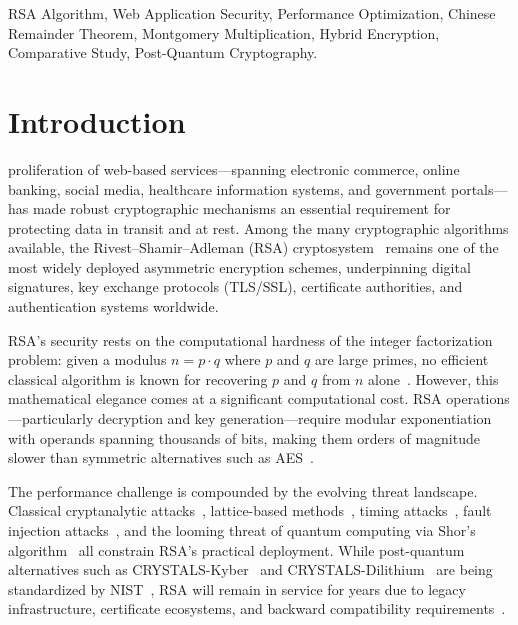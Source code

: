\documentclass[journal]{IEEEtran}
\begin{document}
\begin{IEEEkeywords}
RSA Algorithm, Web Application Security, Performance Optimization, Chinese Remainder Theorem, Montgomery Multiplication, Hybrid Encryption, Comparative Study, Post-Quantum Cryptography.
\end{IEEEkeywords}

\IEEEpeerreviewmaketitle


\section{Introduction}
\label{sec:intro}
 proliferation of web-based services---spanning electronic commerce, online banking, social media, healthcare information systems, and government portals---has made robust cryptographic mechanisms an essential requirement for protecting data in transit and at rest. Among the many cryptographic algorithms available, the Rivest--Shamir--Adleman (RSA) cryptosystem~\cite{rivest1978} remains one of the most widely deployed asymmetric encryption schemes, underpinning digital signatures, key exchange protocols (TLS/SSL), certificate authorities, and authentication systems worldwide.

RSA's security rests on the computational hardness of the integer factorization problem: given a modulus $n = p \cdot q$ where $p$ and $q$ are large primes, no efficient classical algorithm is known for recovering $p$ and $q$ from $n$ alone~\cite{menezes2001}. However, this mathematical elegance comes at a significant computational cost. RSA operations---particularly decryption and key generation---require modular exponentiation with operands spanning thousands of bits, making them orders of magnitude slower than symmetric alternatives such as AES~\cite{nist_fips197}.

The performance challenge is compounded by the evolving threat landscape. Classical cryptanalytic attacks~\cite{boneh1999}, lattice-based methods~\cite{coppersmith1997}, timing attacks~\cite{kocher1996}, fault injection attacks~\cite{boneh2001}, and the looming threat of quantum computing via Shor's algorithm~\cite{shor1997} all constrain RSA's practical deployment. While post-quantum alternatives such as CRYSTALS-Kyber~\cite{kyber2023} and CRYSTALS-Dilithium~\cite{dilithium2022} are being standardized by NIST~\cite{nist_pqc}, RSA will remain in service for years due to legacy infrastructure, certificate ecosystems, and backward compatibility requirements~\cite{nist_sp80057}.
\end{document}
